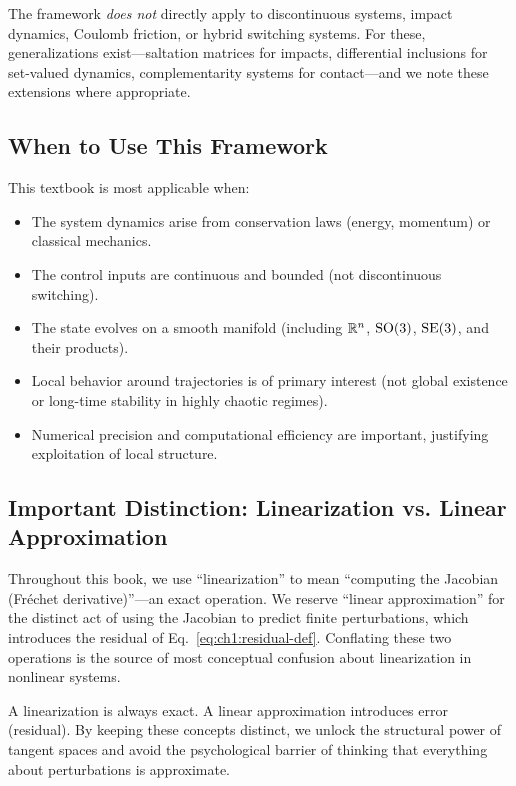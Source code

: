 The framework \emph{does not} directly apply to discontinuous systems, impact dynamics,
Coulomb friction, or hybrid switching systems. For these, generalizations
exist---saltation matrices for impacts, differential inclusions for set-valued dynamics,
complementarity systems for contact---and we note these extensions where appropriate.

\subsection{When to Use This Framework}

This textbook is most applicable when:
\begin{itemize}
\item The system dynamics arise from conservation laws (energy, momentum) or classical mechanics.
\item The control inputs are continuous and bounded (not discontinuous switching).
\item The state evolves on a smooth manifold (including $\mathbb{R}^n$, $\mathrm{SO}(3)$, $\mathrm{SE}(3)$, and their products).
\item Local behavior around trajectories is of primary interest (not global existence or long-time stability in highly chaotic regimes).
\item Numerical precision and computational efficiency are important, justifying exploitation of local structure.
\end{itemize}

\subsection{Important Distinction: Linearization vs. Linear Approximation}

\begin{remark}
Throughout this book, we use ``linearization'' to mean ``computing the Jacobian
(Fréchet derivative)''---an exact operation. We reserve ``linear approximation'' for
the distinct act of using the Jacobian to predict finite perturbations, which introduces
the residual of Eq.~\eqref{eq:ch1:residual-def}. Conflating these two operations is
the source of most conceptual confusion about linearization in nonlinear systems.
\end{remark}

A linearization is always exact. A linear approximation introduces error (residual). By
keeping these concepts distinct, we unlock the structural power of tangent spaces and
avoid the psychological barrier of thinking that everything about perturbations is approximate.

